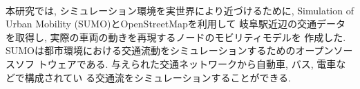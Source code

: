 \\[1em]
\indent 本研究では, シミュレーション環境を実世界により近づけるために, 
Simulation of Urban Mobility (SUMO)\cite{sumo}とOpenStreetMapを利用して
岐阜駅近辺の交通データを取得し, 実際の車両の動きを再現するノードのモビリティモデルを
作成した. SUMOは都市環境における交通流動をシミュレーションするためのオープンソースソフ
トウェアである. 与えられた交通ネットワークから自動車, バス, 電車などで構成されてい
る交通流をシミュレーションすることができる. 